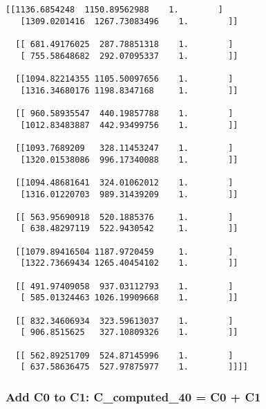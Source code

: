 \documentclass[11pt]{article}
\begin{document}
\begin{Verbatim}[commandchars=\\\{\}]
  [[1136.6854248  1150.89562988    1.        ]
   [1309.0201416  1267.73083496    1.        ]]

  [[ 681.49176025  287.78851318    1.        ]
   [ 755.58648682  292.07095337    1.        ]]

  [[1094.82214355 1105.50097656    1.        ]
   [1316.34680176 1198.8347168     1.        ]]

  [[ 960.58935547  440.19857788    1.        ]
   [1012.83483887  442.93499756    1.        ]]

  [[1093.7689209   328.11453247    1.        ]
   [1320.01538086  996.17340088    1.        ]]

  [[1094.48681641  324.01062012    1.        ]
   [1316.01220703  989.31439209    1.        ]]

  [[ 563.95690918  520.1885376     1.        ]
   [ 638.48297119  522.9430542     1.        ]]

  [[1079.89416504 1187.9720459     1.        ]
   [1322.73669434 1265.40454102    1.        ]]

  [[ 491.97409058  937.03112793    1.        ]
   [ 585.01324463 1026.19909668    1.        ]]

  [[ 832.34606934  323.59613037    1.        ]
   [ 906.8515625   327.10809326    1.        ]]

  [[ 562.89251709  524.87145996    1.        ]
   [ 637.58636475  527.97875977    1.        ]]]]

    \end{Verbatim}

    \hypertarget{add-c0-to-c1-c_computed_40-c0-c1}{%
\subsubsection{Add C0 to C1: C\_computed\_40 = C0 +
C1}\label{add-c0-to-c1-c_computed_40-c0-c1}}
\end{document}
